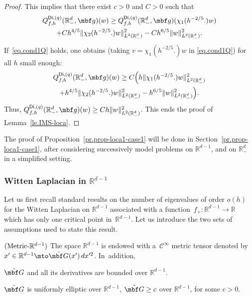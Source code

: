 \begin{proof}
This implies that there exist $c>0$ and $C>0$ such that
\begin{multline*}
Q_{f,h}^{\mathsf{Di},(q)}(\mathbb R^d_-,\mbf g)(w)\ge Q_{f,h}^{\mathsf{Di},(q)}(\mathbb R^d_-,\mbf g)(\chi_1(h^{-2/5 }.)w)\\+Ch^{4/5}\Vert \chi_2(h^{-2/5 }.) w \Vert_{L^2(\mathbb R_-^d)}^2
-Ch^{6/5} \Vert w \Vert_{L^2(\mathbb R_-^d)}^2.
\end{multline*}
If~\eqref{eq.cond1Q} holds,
one obtains (taking $v=\chi_1(h^{-2/5 }.) w$ in \eqref{eq.cond1Q}) for all $h$ small enough:
\begin{multline*}
Q_{f,h}^{\mathsf{Di},(q)}(\mathbb R^d_-,\mbf g)(w)\ge C\Bigl(h \Vert
\chi_1(h^{-2/5
}.) w
\Vert_{L^2(\mathbb
R_-^d)}^2\\
+
h^{4/5}
\Vert
\chi_2(h^{-2/5
}.) w
\Vert_{L^2(\mathbb
R_-^d)}^2- h^{6/5} \Vert w \Vert_{L^2(\mathbb R_-^d)}^2\Bigr).
\end{multline*}
Thus, $Q_{f,h}^{\mathsf{Di},(q)}(\mathbb R^d_-,\mbf g)(w)\ge Ch \Vert w \Vert_{L^2(\mathbb R_-^d)}^2$. This ends the proof of Lemma~\ref{le.IMS-loca}.
\end{proof}
The proof of Proposition~\ref{pr.prop-loca1-case1} will be done in
Section~\ref{pr.prop-loca1-case1}, after considering successively
model problems on $\mathbb R^{d-1}$, and on $\mathbb R^d_-$ in a
simplified setting.

\subsubsection{Witten Laplacian in $\mathbb R^{d-1}$}\label{sec.Rdmoins_d-1}
Let us first recall standard results on the number of eigenvalues of
order $o(h)$ for the Witten Laplacian on $\mathbb R^{d-1}$ associated with a function~$f_+:\mathbb R^{d-1}\to \mathbb R$ which has only one critical point in~$\mathbb R^{d-1}$.
Let us introduce the two sets of assumptions used to state this result.

\begin{manualassumption}{$(\textup{Metric-}\mathbb R^{d-1})$}\label{MetricRd-1}
The space ${\mathbb R^{d-1}}$ is endowed with a~$\mathcal C^\infty$ metric tensor denoted by $x'\in \mathbb R^{d-1} \mto \tilde {\mbf G}(x')\, dx'^2$. In~addition,
\begin{enumeratei}
\item\label{MetricRd-1i}
$\tilde {\mbf G}$ and all its derivatives are bounded over ${\mathbb R^{d-1}}$.
\item\label{MetricRd-1ii}
$ \tilde {\mbf G}$ is uniformly elliptic over $ {\mathbb
R^{d-1}}$, \ie $ \tilde {\mbf G}\ge c$ over $\mathbb R^{d-1}$, for some $c>0$.
\end{enumeratei}
\end{manualassumption}

